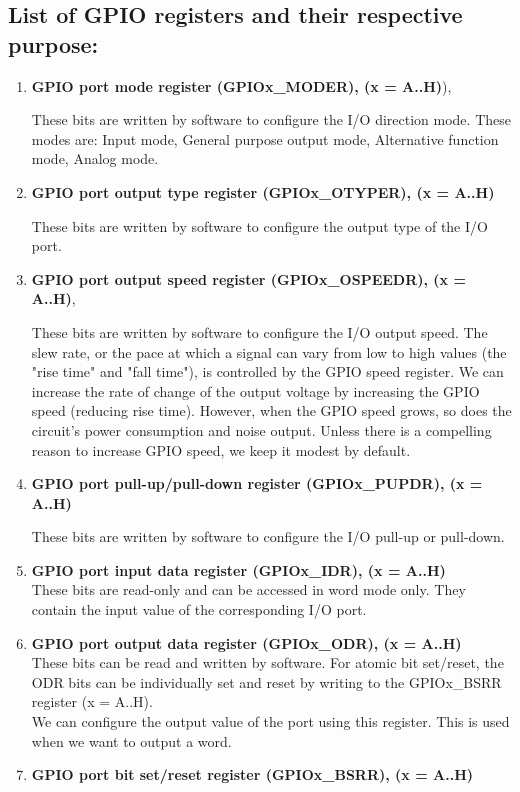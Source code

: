 \documentclass[12pt]{article}
\begin{document}
\subsection{List of GPIO registers and their respective purpose:}
\begin{enumerate}
    \item \textbf{GPIO port mode register (GPIOx\_MODER), (x = A..H)}), 
    \par These bits are written by software to configure the I/O direction mode. These modes are: Input mode, General purpose output mode, Alternative function mode, Analog mode.
    \item \textbf{GPIO port output type register (GPIOx\_OTYPER), (x = A..H)}
    \par These bits are written by software to configure the output type of the I/O port.
    \item \textbf{GPIO port output speed register (GPIOx\_OSPEEDR), (x = A..H)}, 
    \par These bits are written by software to configure the I/O output speed. The slew rate, or the pace at which a signal can vary from low to high values (the "rise time" and "fall time"), is controlled by the GPIO speed register. We can increase the rate of change of the output voltage by increasing the GPIO speed (reducing rise time). However, when the GPIO speed grows, so does the circuit's power consumption and noise output. Unless there is a compelling reason to increase GPIO speed, we keep it modest by default.
    \item \textbf{GPIO port pull-up/pull-down register (GPIOx\_PUPDR), (x = A..H)}
    \par These bits are written by software to configure the I/O pull-up or pull-down.
    \item \textbf{GPIO port input data register (GPIOx\_IDR), (x = A..H)}
    \\ These bits are read-only and can be accessed in word mode only. They contain the input value of the corresponding I/O port.
    \item \textbf{GPIO port output data register (GPIOx\_ODR), (x = A..H)}
    \\ These bits can be read and written by software. For atomic bit set/reset, the ODR bits can be individually set and reset by writing to the GPIOx\_BSRR register (x = A..H).
   \\ We can configure the output value of the port using this register. This is used when we want to output a word.
   \item \textbf{GPIO port bit set/reset register (GPIOx\_BSRR), (x = A..H)}

\end{enumerate}
\end{document}

